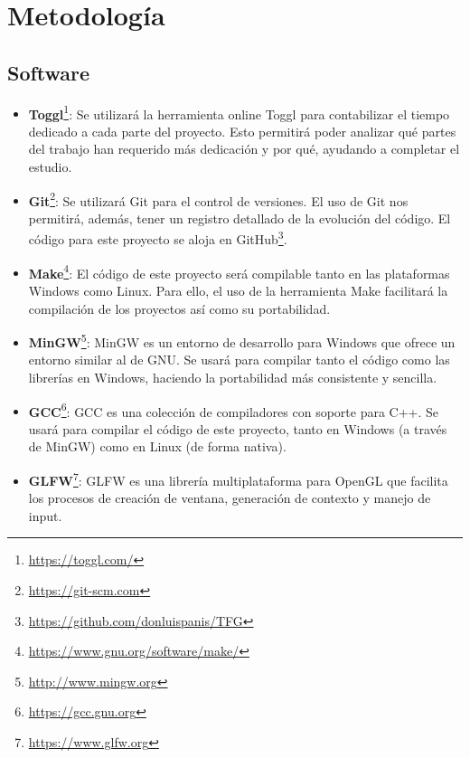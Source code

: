 
\chapter{Metodología}

\section{Software}

\begin{itemize}
	\item \textbf{Toggl}\footnote{\url{https://toggl.com/}}: Se utilizará la herramienta online Toggl para contabilizar el tiempo dedicado a cada parte del proyecto. Esto permitirá poder analizar qué partes del trabajo han requerido más dedicación y por qué, ayudando a completar el estudio.
	\item \textbf{Git}\footnote{\url{https://git-scm.com}}: Se utilizará Git para el control de versiones. El uso de Git nos permitirá, además, tener un registro detallado de la evolución del código. El código para este proyecto se aloja en GitHub\footnote{\url{https://github.com/donluispanis/TFG}}.
	\item \textbf{Make}\footnote{\url{https://www.gnu.org/software/make/}}: El código de este proyecto será compilable tanto en las plataformas Windows como Linux. Para ello, el uso de la herramienta Make facilitará la compilación de los proyectos así como su portabilidad.
	\item \textbf{MinGW}\footnote{\url{http://www.mingw.org}}: MinGW es un entorno de desarrollo para Windows que ofrece un entorno similar al de GNU. Se usará para compilar tanto el código como las librerías en Windows, haciendo la portabilidad más consistente y sencilla.
	\item \textbf{GCC}\footnote{\url{https://gcc.gnu.org}}: GCC es una colección de compiladores con soporte para C++. Se usará para compilar el código de este proyecto, tanto en Windows (a través de MinGW) como en Linux (de forma nativa).
	\item \textbf{GLFW}\footnote{\url{https://www.glfw.org}}: GLFW es una librería multiplataforma para OpenGL que facilita los procesos de creación de ventana, generación de contexto y manejo de input. 

\end{itemize}
